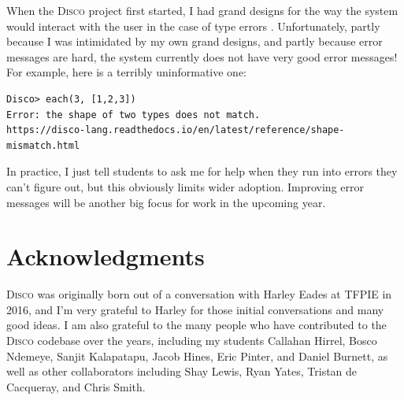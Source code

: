 \documentclass[copyright,creativecommons]{eptcs}
\newcommand{\disco}{\textsc{Disco}\xspace}
\begin{document}
When the \disco project first started, I had grand designs for the way
the system would interact with the user in the case of type errors
\cite{yorgey2018explaining}. Unfortunately, partly because I was
intimidated by my own grand designs, and partly because error messages
are hard, the system currently does not have very good error messages!
For example, here is a terribly uninformative one:
\begin{verbatim}
Disco> each(3, [1,2,3])
Error: the shape of two types does not match.
https://disco-lang.readthedocs.io/en/latest/reference/shape-mismatch.html
\end{verbatim}
In practice, I just tell students to ask me for help when they run
into errors they can't figure out, but this obviously limits wider
adoption.  Improving error messages will be another big focus for work
in the upcoming year.

\section{Acknowledgments}
\label{sec:acks}

\disco was originally born out of a conversation with Harley Eades at
TFPIE in 2016, and I'm very grateful to Harley for those initial
conversations and many good ideas.  I am also grateful to the many
people who have contributed to the \disco codebase over the years,
including my students Callahan Hirrel, Bosco Ndemeye, Sanjit
Kalapatapu, Jacob Hines, Eric Pinter, and Daniel Burnett, as well as
other collaborators including Shay Lewis, Ryan Yates, Tristan de
Cacqueray, and Chris Smith.



\end{document}
